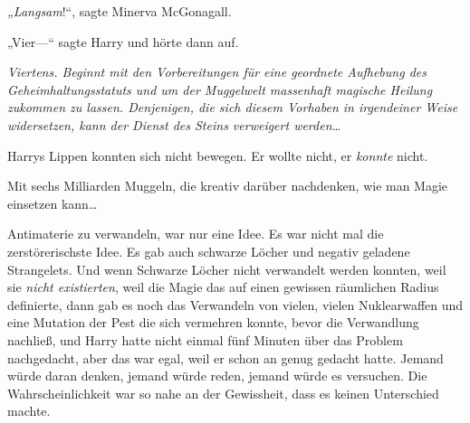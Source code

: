\emph{„Langsam}!“, sagte Minerva McGonagall.

„Vier—“ sagte Harry und hörte dann auf.

\emph{Viertens. Beginnt mit den Vorbereitungen für eine geordnete Aufhebung des Geheimhaltungsstatuts und um der Muggelwelt massenhaft magische Heilung zukommen zu lassen. Denjenigen, die sich diesem Vorhaben in irgendeiner Weise widersetzen, kann der Dienst des Steins verweigert werden…}

Harrys Lippen konnten sich nicht bewegen. Er wollte nicht, er \emph{konnte} nicht.

Mit sechs Milliarden Muggeln, die kreativ darüber nachdenken, wie man Magie einsetzen kann…

Antimaterie zu verwandeln, war nur eine Idee. Es war nicht mal die zerstörerischste Idee. Es gab auch schwarze Löcher und negativ geladene Strangelets.
Und wenn Schwarze Löcher nicht verwandelt werden konnten, weil sie \emph{nicht existierten}, weil die Magie das auf einen gewissen räumlichen Radius definierte, dann gab es noch das Verwandeln von vielen, vielen Nuklearwaffen und eine Mutation der Pest die sich vermehren konnte, bevor die Verwandlung nachließ, und Harry hatte nicht einmal fünf Minuten über das Problem nachgedacht, aber das war egal, weil er schon an genug gedacht hatte.
Jemand würde daran denken, jemand würde reden, jemand würde es versuchen. Die Wahrscheinlichkeit war so nahe an der Gewissheit, dass es keinen Unterschied machte.

